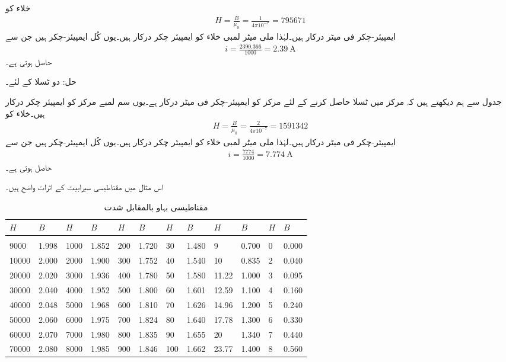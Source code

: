 خلاء کو
\begin{align*}
H=\frac{B}{\mu_0}=\frac{1}{4\pi 10^{-7}}=\num{795671}
\end{align*}
ایمپیئر-چکر فی میٹر درکار ہیں۔لہٰذا  ملی میٹر لمبی خلاء کو  ایمپیئر چکر درکار ہیں۔یوں کُل ایمپیئر-چکر  ہیں جن سے 
\begin{align*}
i=\frac{2390.366}{1000}=\SI{2.39}{\ampere}
\end{align*}	
حاصل ہوتی ہے۔

حل: دو ٹسلا کے لئے۔

جدول  سے ہم دیکھتے ہیں کہ مرکز میں  ٹسلا  حاصل کرنے کے لئے  مرکز کو  ایمپیئر-چکر فی میٹر  درکار ہے۔یوں  سم لمبے مرکز کو  ایمپیئر چکر درکار ہیں۔خلاء کو
\begin{align*}
H=\frac{B}{\mu_0}=\frac{2}{4\pi 10^{-7}}=\num{1591342}
\end{align*}
ایمپیئر-چکر فی میٹر درکار ہیں۔لہٰذا  ملی میٹر لمبی خلاء کو    ایمپیئر چکر درکار ہیں۔یوں کُل ایمپیئر-چکر 	ہیں جن سے 
\begin{align*}
i=\frac{7774}{1000}=\SI{7.774}{\ampere}
\end{align*}
حاصل ہوتی ہے۔

اس مثال میں مقناطیسی سیرابیت کے اثرات واضح ہیں۔ 
%
\begin{table}
\begin{tabular}{l l l l   l l l l   l l l l}
$H$&$B$&$H$&$B$&$H$&$B$&$H$&$B$&$H$&$B$&$H$&$B$\\
\hline\\
9000&1.998&1000&1.852&           200&1.720 &30&1.480               &9&0.700&  0&0.000    \\
10000&2.000&2000&1.900&         300&1.752 &40&1.540           &10&0.835&  2&0.040    \\
20000&2.020&3000&1.936&         400&1.780 &50&1.580          &11.22&1.000&  3&0.095    \\
30000&2.040& 4000&1.952&        500&1.800 &60&1.601         &12.59&1.100 &  4&0.160    \\
40000&2.048&5000&1.968&         600&1.810 &70&1.626          &14.96&1.200&   5&0.240    \\
50000&2.060&6000&1.975&         700&1.824 &80&1.640         &17.78&1.300&  6&0.330    \\
60000&2.070&7000&1.980&         800&1.835  &90&1.655         &20&1.340&  7&0.440    \\
 70000&2.080&8000&1.985&        900&1.846 &100&1.662          &23.77&1.400& 8&0.560    \\
\hline
\end{tabular}
\caption{مقناطیسی بہاو بالمقابل شدت}
\label{جدول_مقناطیسی_ادوار_کثافت_بہاو_بالمقابل_شدت}
\end{table}
%

